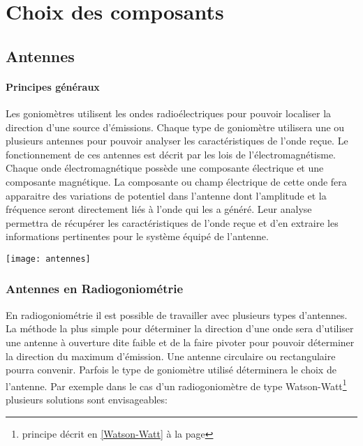 \chapter{Choix des composants}


\section{Antennes}

\subsubsection{Principes généraux}

	Les goniomètres utilisent les ondes radioélectriques pour pouvoir localiser la direction d'une source d'émissions. Chaque type de goniomètre utilisera une ou plusieurs antennes pour pouvoir analyser les caractéristiques de l'onde reçue. 
	Le fonctionnement de ces antennes est décrit par les lois de l'électromagnétisme. Chaque onde électromagnétique possède une composante électrique et une composante magnétique. La composante ou champ électrique de cette onde fera apparaitre des variations de potentiel dans l'antenne dont l'amplitude et la fréquence seront directement liés à l'onde qui les a généré. Leur analyse permettra de récupérer les caractéristiques de l'onde reçue et d'en extraire les informations pertinentes pour le système équipé de l'antenne.

        \begin{center}
          \texttt{[image: antennes]}
        \end{center}

\subsection{Antennes en Radiogoniométrie}

En radiogoniométrie il est possible de travailler avec plusieurs types d'antennes. La méthode la plus simple pour déterminer la direction d'une onde sera d'utiliser une antenne à ouverture dite faible et de la faire pivoter pour pouvoir déterminer la direction du maximum d'émission. Une antenne circulaire ou rectangulaire pourra convenir. Parfois le type de goniomètre utilisé déterminera le choix de l'antenne. Par exemple dans le cas d'un radiogoniomètre de type Watson-Watt\footnote{principe décrit en \ref{Watson-Watt} à la page \pageref{Watson-Watt}} plusieurs solutions sont envisageables: 
	
